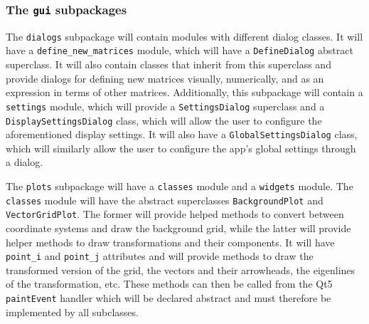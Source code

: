 \documentclass[../main.tex]{subfiles}
\begin{document}
\subsubsection{The \texttt{gui} subpackages\label{subsubsection:the-gui-subpackages}}

\begin{center}
\end{center}

The \texttt{dialogs} subpackage will contain modules with different dialog classes. It will have a \texttt{define\_new\_matrices} module, which will have a \texttt{DefineDialog} abstract superclass. It will also contain classes that inherit from this superclass and provide dialogs for defining new matrices visually, numerically, and as an expression in terms of other matrices. Additionally, this subpackage will contain a \texttt{settings} module, which will provide a \texttt{SettingsDialog} superclass and a \texttt{DisplaySettingsDialog} class, which will allow the user to configure the aforementioned display settings. It will also have a \texttt{GlobalSettingsDialog} class, which will similarly allow the user to configure the app's global settings through a dialog.

The \texttt{plots} subpackage will have a \texttt{classes} module and a \texttt{widgets} module. The \texttt{classes} module will have the abstract superclasses \texttt{BackgroundPlot} and \texttt{VectorGridPlot}. The former will provide helped methods to convert between coordinate systems and draw the background grid, while the latter will provide helper methods to draw transformations and their components. It will have \texttt{point\_i} and \texttt{point\_j} attributes and will provide methods to draw the transformed version of the grid, the vectors and their arrowheads, the eigenlines of the transformation, etc. These methods can then be called from the Qt5 \texttt{paintEvent} handler which will be declared abstract and must therefore be implemented by all subclasses.
\end{document}
